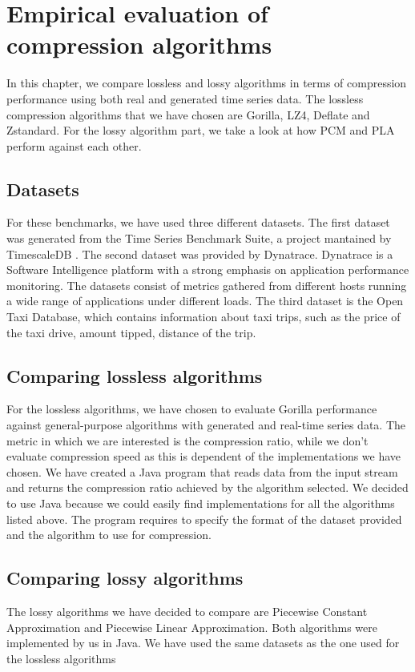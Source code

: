 \chapter{Empirical evaluation of compression algorithms}
In this chapter, we compare lossless and lossy algorithms in terms of compression performance using both real and 
generated time series data. The lossless compression algorithms that we have chosen are Gorilla, LZ4,
Deflate and Zstandard. For the lossy algorithm part, we take a look at how PCM and PLA perform against each other. 

\section{Datasets}
For these benchmarks, we have used three different datasets. The first dataset was generated from the
Time Series Benchmark Suite, a project mantained by TimescaleDB \cite{}.
The second dataset was provided by Dynatrace. Dynatrace is a Software Intelligence platform with a strong
emphasis on application performance monitoring. The datasets consist of metrics gathered from
different hosts running a wide range of applications under different loads.
The third dataset is the Open Taxi Database, which contains information about taxi trips, such as the
price of the taxi drive, amount tipped, distance of the trip.

\section{Comparing lossless algorithms}
For the lossless algorithms, we have chosen to evaluate Gorilla performance against general-purpose
algorithms with generated and real-time series data. The metric in which we are interested is the
compression ratio, while we don't evaluate compression speed as this is dependent of the implementations we have
chosen. We have created a Java program that reads data from the input stream and returns the compression ratio
achieved by the algorithm selected. We decided to use Java because we could easily find implementations for
all the algorithms listed above. The program requires to specify the format of the dataset provided and the
algorithm to use for compression.

\section{Comparing lossy algorithms}
The lossy algorithms we have decided to compare are Piecewise Constant Approximation and Piecewise Linear
Approximation. Both algorithms were implemented by us in Java. We have used the same datasets as the one used
for the lossless algorithms


